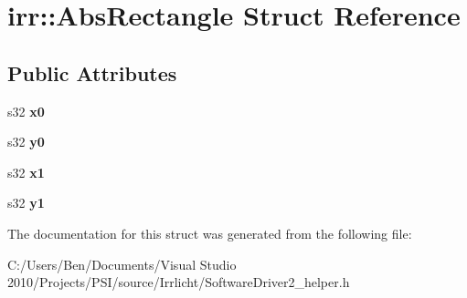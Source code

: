 \hypertarget{structirr_1_1_abs_rectangle}{\section{irr\-:\-:Abs\-Rectangle Struct Reference}
\label{structirr_1_1_abs_rectangle}
}
\subsection*{Public Attributes}
\begin{DoxyCompactItemize}
\item 
\hypertarget{structirr_1_1_abs_rectangle_a49222bedb0368848ee92b5429d270b6b}{s32 {\bfseries x0}}\label{structirr_1_1_abs_rectangle_a49222bedb0368848ee92b5429d270b6b}

\item 
\hypertarget{structirr_1_1_abs_rectangle_ab04812835fd3d780de10cc19c8a782f0}{s32 {\bfseries y0}}\label{structirr_1_1_abs_rectangle_ab04812835fd3d780de10cc19c8a782f0}

\item 
\hypertarget{structirr_1_1_abs_rectangle_a98f436dfba8719e121ae1ada8f5901a1}{s32 {\bfseries x1}}\label{structirr_1_1_abs_rectangle_a98f436dfba8719e121ae1ada8f5901a1}

\item 
\hypertarget{structirr_1_1_abs_rectangle_a2d899321f5fc3d893ab923f25f5ea25c}{s32 {\bfseries y1}}\label{structirr_1_1_abs_rectangle_a2d899321f5fc3d893ab923f25f5ea25c}

\end{DoxyCompactItemize}


The documentation for this struct was generated from the following file\-:\begin{DoxyCompactItemize}
\item 
C\-:/\-Users/\-Ben/\-Documents/\-Visual Studio 2010/\-Projects/\-P\-S\-I/source/\-Irrlicht/Software\-Driver2\-\_\-helper.\-h\end{DoxyCompactItemize}
